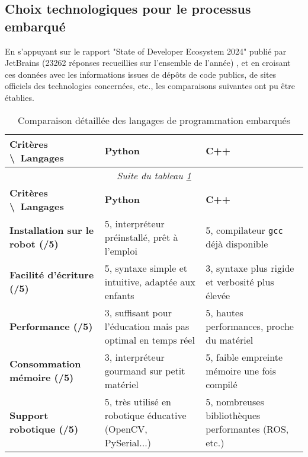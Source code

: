 \subsection{Choix technologiques pour le processus embarqué} \label{sec:choix_robot}

En s’appuyant sur le rapport "State of Developer Ecosystem 2024" publié par JetBrains (23262 réponses recueillies sur l’ensemble de l’année) \autocite{noauthor_software_nodate}, et en croisant ces données avec les informations issues de dépôts de code publics, de sites officiels des technologies concernées, etc., les comparaisons suivantes ont pu être établies.

\begin{longtable}{|p{}|p{}|p{}|}
\caption{\label{tab:comparison_robot_languages} Comparaison détaillée des langages de programmation embarqués} \\

\hline
\textbf{Critères \textbackslash\ Langages} & \textbf{Python} & \textbf{C++} \\
\hline
\endfirsthead

\multicolumn{3}{c}{\textit{Suite du tableau \ref{tab:comparison_robot_languages}}} \\
\hline
\textbf{Critères \textbackslash\ Langages} & \textbf{Python} & \textbf{C++} \\
\hline
\endhead

\textbf{Installation sur le robot (/5)} & 
5, interpréteur préinstallé, prêt à l’emploi & 
5, compilateur \texttt{gcc} déjà disponible \\
\hline

\textbf{Facilité d’écriture (/5)} & 
5, syntaxe simple et intuitive, adaptée aux enfants & 
3, syntaxe plus rigide et verbosité plus élevée \\
\hline

\textbf{Performance (/5)} & 
3, suffisant pour l’éducation mais pas optimal en temps réel & 
5, hautes performances, proche du matériel \\
\hline

\textbf{Consommation mémoire (/5)} & 
3, interpréteur gourmand sur petit matériel & 
5, faible empreinte mémoire une fois compilé \\
\hline

\textbf{Support robotique (/5)} & 
5, très utilisé en robotique éducative (OpenCV, PySerial...) & 
5, nombreuses bibliothèques performantes (ROS, etc.) \\
\hline


\end{longtable}
